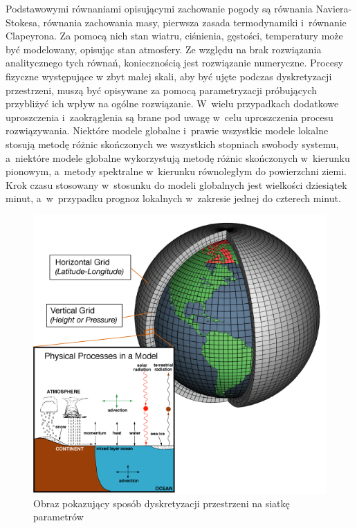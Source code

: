 Podstawowymi równaniami opisującymi zachowanie pogody są równania Naviera-Stokesa, równania zachowania
masy, pierwsza zasada termodynamiki i~równanie Clapeyrona. Za pomocą nich stan wiatru, ciśnienia,
gęstości, temperatury może być modelowany, opisując stan atmosfery. Ze względu na brak rozwiązania
analitycznego tych równań, koniecznością jest rozwiązanie numeryczne. Procesy fizyczne występujące
w zbyt małej skali, aby być ujęte podczas dyskretyzacji przestrzeni, muszą być opisywane za pomocą
parametryzacji próbujących przybliżyć ich wpływ na ogólne rozwiązanie. W~wielu przypadkach 
dodatkowe uproszczenia i~zaokrąglenia są brane pod uwagę w~celu uproszczenia procesu
rozwiązywania. Niektóre modele globalne i~prawie wszystkie modele lokalne stosują 
metodę różnic skończonych we wszystkich stopniach swobody systemu, a~niektóre modele globalne
wykorzystują metodę różnic skończonych w~kierunku pionowym, a~metody spektralne w~kierunku równoległym
do powierzchni ziemi. Krok czasu stosowany w~stosunku do modeli globalnych jest wielkości dziesiątek
minut, a~w~przypadku prognoz lokalnych w~zakresie jednej do czterech minut.

\begin{figure}[H]
    \centering
    \includegraphics[width=\textwidth]{images/grid.png}
    \caption[Dyskretyzacja siatki parametrów]{Obraz pokazujący sposób dyskretyzacji przestrzeni
    na siatkę parametrów\footnotemark}
    \label{grid}
\end{figure}

